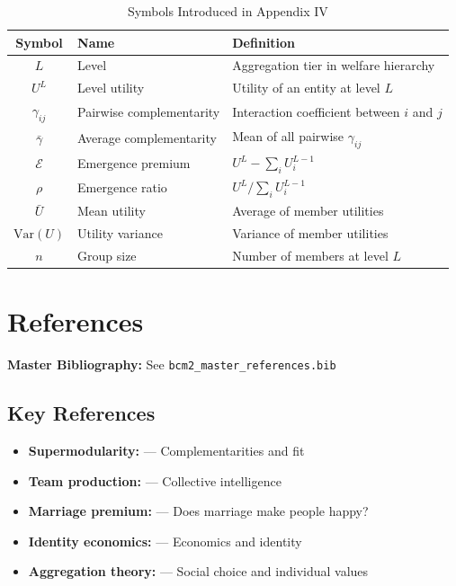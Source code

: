 \begin{table}[htbp]
\centering
\caption{Symbols Introduced in Appendix IV}
\label{tab:let-symbols}
\renewcommand{\arraystretch}{1.3}
\begin{tabular}{@{}clp{6cm}@{}}
\toprule
\textbf{Symbol} & \textbf{Name} & \textbf{Definition} \\
\midrule
$L$ & Level & Aggregation tier in welfare hierarchy \\
$U^L$ & Level utility & Utility of an entity at level $L$ \\
$\gamma_{ij}$ & Pairwise complementarity & Interaction coefficient between $i$ and $j$ \\
$\bar{\gamma}$ & Average complementarity & Mean of all pairwise $\gamma_{ij}$ \\
$\mathcal{E}$ & Emergence premium & $U^L - \sum_i U^{L-1}_i$ \\
$\rho$ & Emergence ratio & $U^L / \sum_i U^{L-1}_i$ \\
$\bar{U}$ & Mean utility & Average of member utilities \\
$\text{Var}(U)$ & Utility variance & Variance of member utilities \\
$n$ & Group size & Number of members at level $L$ \\
\bottomrule
\end{tabular}
\end{table}


\section{References}
\label{sec:let-references}

\begin{tcolorbox}[colback=blue!5!white, colframe=blue!75!black]
\textbf{Master Bibliography:} See \texttt{bcm2\_master\_references.bib}
\end{tcolorbox}

\subsection{Key References}

\begin{itemize}[nosep]
\item \textbf{Supermodularity:} \citet{milgromroberts1995} --- Complementarities and fit
\item \textbf{Team production:} \citet{woolley2010} --- Collective intelligence
\item \textbf{Marriage premium:} \citet{stutzer2006} --- Does marriage make people happy?
\item \textbf{Identity economics:} \citet{akerlof2000} --- Economics and identity
\item \textbf{Aggregation theory:} \citet{arrow1951} --- Social choice and individual values
\end{itemize}

